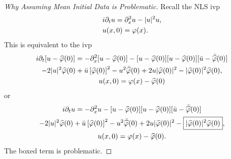 \begin{proof}[Why Assuming Mean Initial Data is Problematic]
Recall the NLS ivp
%
%
\begin{equation*}
	\begin{split}
		&i \partial_t u = \partial_x^2 u - | u |^2 u,
		\\
		& u(x,0) = \varphi(x).
	\end{split}
\end{equation*}
%
%
This is equivalent to the ivp
%
%
\begin{gather*}
		 i \partial_t [u - \widehat{\varphi}(0)]
		  = -\partial_x^2 [u - \widehat{\varphi}(0)] - [u -
		\widehat{\varphi}(0)][u - \widehat{\varphi}(0)][\bar{u} - \bar{\widehat{\varphi}}(0)]
		\\
		- 2| u |^2
		\widehat{\varphi}(0) + \bar{u}\left[ \widehat{\varphi}(0) \right]^2 - u^{2}
		\bar{\widehat{\varphi}}(0) + 2 u | \widehat{\varphi}(0) |^2 - | \widehat{\varphi}(0) |^2
		\widehat{\varphi}(0),
		\\
		u(x,0) = \varphi(x) - \widehat{\varphi}(0)
\end{gather*}
or
%
%
\begin{gather*}
		 i \partial_t u 
		  = -\partial_x^2 u - [u -
		\widehat{\varphi}(0)][u - \widehat{\varphi}(0)][\bar{u} - \bar{\widehat{\varphi}}(0)]
		\\
		- 2| u |^2
		\widehat{\varphi}(0) + \bar{u}\left[ \widehat{\varphi}(0) \right]^2 - u^{2}
		\bar{\widehat{\varphi}}(0) + 2 u | \widehat{\varphi}(0) |^2 - \boxed{| \widehat{\varphi}(0) |^2
		\widehat{\varphi}(0)},
		\\
		u(x,0) = \varphi(x) - \widehat{\varphi}(0).
\end{gather*}
%
The boxed term is problematic. 
\end{proof}
%
